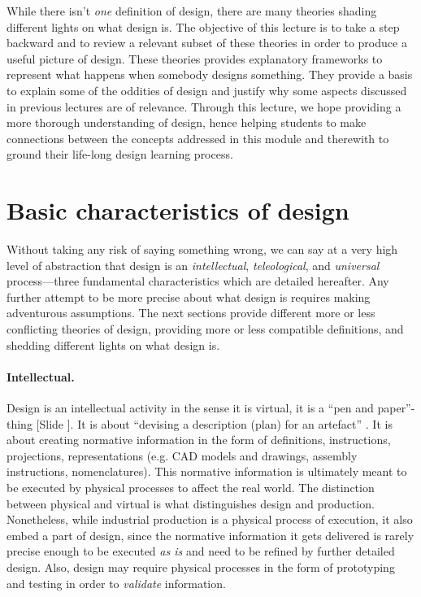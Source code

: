 \documentclass{article}
\newcounter{slide}
\begin{document}
While there isn't \emph{one} definition of design, there are many theories shading different lights on what design is. The objective of this lecture is to take a step backward and to review a relevant subset of these theories in order to produce a useful picture of design. These theories provides explanatory frameworks to represent what happens when somebody designs something. They provide a basis to explain some of the oddities of design and justify why some aspects discussed in previous lectures are of relevance. Through this lecture, we hope providing a more thorough understanding of design, hence helping students to make connections between the concepts addressed in this module and therewith to ground their life-long design learning process.

\section{Basic characteristics of design}
\label{sec:whatisdesign}

Without taking any risk of saying something wrong, we can say at a very high level of abstraction that design is an \emph{intellectual}, \emph{teleological}, and \emph{universal} process---three fundamental characteristics which are detailed hereafter. Any further attempt to be more precise about what design is requires making adventurous assumptions. The next sections provide different more or less conflicting theories of design, providing more or less compatible definitions, and shedding different lights on what design is. 

\paragraph{Intellectual.} Design is an intellectual activity in the sense it is virtual, it is a ``pen and paper''-thing {\color{blue}[Slide ]}. It is about ``devising a description (plan) for an artefact'' \cite{hybsEvolutionaryProcessModel1992}. It is about creating normative information in the form of definitions, instructions, projections, representations (e.g. CAD models and drawings, assembly instructions, nomenclatures). This normative information is ultimately meant to be executed by physical processes to affect the real world. The distinction between physical and virtual is what distinguishes design and production. Nonetheless, while industrial production is a physical process of execution, it also embed a part of design, since the normative information it gets delivered is rarely precise enough to be executed \emph{as is} and need to be refined by further detailed design. Also, design may require physical processes in the form of prototyping and testing in order to \emph{validate} information.
\end{document}
